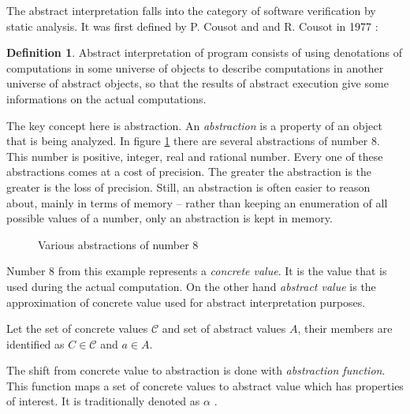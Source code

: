 \documentclass[12pt,final,oneside]{fithesis2}
\theoremstyle{definition}
\newtheorem{definition}{Definition}
\begin{document}
The abstract interpretation falls into the category of software
verification by static analysis. It was first defined by P. Cousot and
and R. Cousot in 1977 \cite{CousotCousot77-1}:

\begin{definition}
Abstract interpretation of program consists of using denotations of
computations in some universe of objects to describe computations in
another universe of abstract objects, so that the results of abstract
execution give some informations on the actual computations.
\end{definition}

The key concept here is abstraction. An \textit{abstraction} is a property
of an object that is being analyzed. In figure \ref{fig:abstraction}
there are several abstractions of number 8. This number is positive,
integer, real and rational number. Every one of these abstractions comes
at a cost of precision. The greater the abstraction is the greater is the
loss of precision. Still, an abstraction is often easier to reason about,
mainly in terms of memory -- rather than keeping an enumeration of all
possible values of a number, only an abstraction is kept in memory.

\begin{figure}[h]
\centering
{}
\caption{Various abstractions of number 8}
\label{fig:abstraction}
\end{figure}

Number 8 from this example represents a \textit{concrete value}. It is
the value that is used during the actual computation. On the other hand
\textit{abstract value} is the approximation of concrete value used for abstract
interpretation purposes.

Let the set of concrete values $\mathcal{C}$ and set of abstract values $A$, their members
are identified as $C \in \mathcal{C}$ and $a \in A$.

The shift from concrete value to abstraction is done with
\textit{abstraction function}. This function maps a set of concrete values to
abstract value which has properties of interest. It is traditionally denoted as
$\alpha$ \cite{CousotCousot76-1}.
\end{document}
